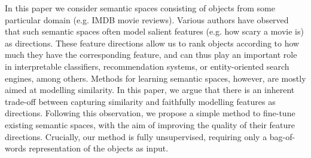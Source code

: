 In this paper we consider semantic spaces consisting of objects from some particular domain (e.g. IMDB movie reviews). Various authors have observed that such semantic spaces often model salient features (e.g. how scary a movie is) as directions. These feature directions allow us to rank objects according to how much they have the corresponding feature, and can thus play an important role in interpretable classifiers, recommendation systems, or entity-oriented search engines, among others. Methods for learning semantic spaces, however, are mostly aimed at modelling similarity. In this paper, we argue that there is an inherent trade-off between capturing similarity and faithfully modelling features as directions. Following this observation, we propose a simple method to fine-tune existing semantic spaces, with the aim of improving the quality of their feature directions. Crucially, our method is fully unsupervised, requiring only a bag-of-words representation of the objects as input.
